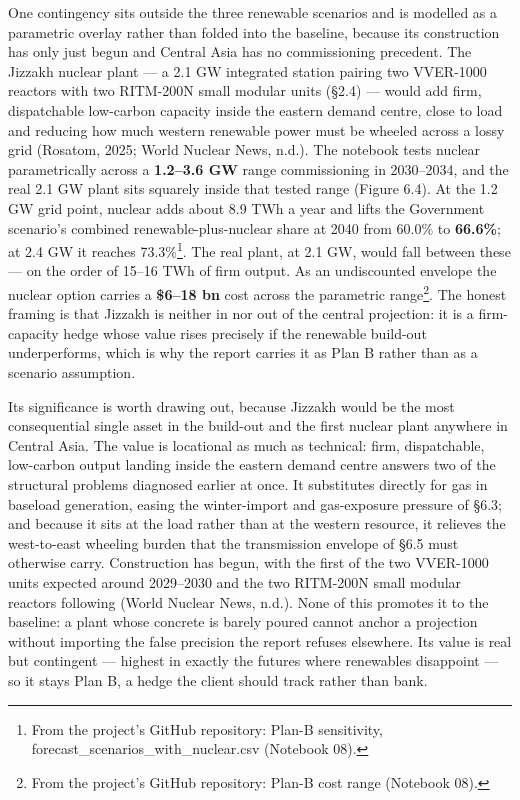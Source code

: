 \documentclass[10pt,twocolumn]{article}
\begin{document}
One contingency sits outside the three renewable scenarios and is modelled as a parametric overlay rather than folded into the baseline, because its construction has only just begun and Central Asia has no commissioning precedent. The Jizzakh nuclear plant --- a 2.1 GW integrated station pairing two VVER-1000 reactors with two RITM-200N small modular units (\S{}2.4) --- would add firm, dispatchable low-carbon capacity inside the eastern demand centre, close to load and reducing how much western renewable power must be wheeled across a lossy grid (Rosatom, 2025; World Nuclear News, n.d.). The notebook tests nuclear parametrically across a \textbf{1.2--3.6 GW} range commissioning in 2030--2034, and the real 2.1 GW plant sits squarely inside that tested range (Figure 6.4). At the 1.2 GW grid point, nuclear adds about 8.9 TWh a year and lifts the Government scenario's combined renewable-plus-nuclear share at 2040 from 60.0\% to \textbf{66.6\%}; at 2.4 GW it reaches 73.3\%\footnote{From the project's GitHub repository: Plan-B sensitivity, forecast\_scenarios\_with\_nuclear.csv (Notebook 08).}. The real plant, at 2.1 GW, would fall between these --- on the order of 15--16 TWh of firm output. As an undiscounted envelope the nuclear option carries a \textbf{\$6--18 bn} cost across the parametric range\footnote{From the project's GitHub repository: Plan-B cost range (Notebook 08).}. The honest framing is that Jizzakh is neither in nor out of the central projection: it is a firm-capacity hedge whose value rises precisely if the renewable build-out underperforms, which is why the report carries it as Plan B rather than as a scenario assumption.

Its significance is worth drawing out, because Jizzakh would be the most consequential single asset in the build-out and the first nuclear plant anywhere in Central Asia. The value is locational as much as technical: firm, dispatchable, low-carbon output landing inside the eastern demand centre answers two of the structural problems diagnosed earlier at once. It substitutes directly for gas in baseload generation, easing the winter-import and gas-exposure pressure of \S{}6.3; and because it sits at the load rather than at the western resource, it relieves the west-to-east wheeling burden that the transmission envelope of \S{}6.5 must otherwise carry. Construction has begun, with the first of the two VVER-1000 units expected around 2029--2030 and the two RITM-200N small modular reactors following (World Nuclear News, n.d.). None of this promotes it to the baseline: a plant whose concrete is barely poured cannot anchor a projection without importing the false precision the report refuses elsewhere. Its value is real but contingent --- highest in exactly the futures where renewables disappoint --- so it stays Plan B, a hedge the client should track rather than bank.
\end{document}
